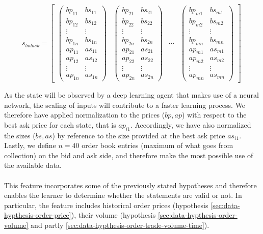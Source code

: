 \begin{equation}\label{eq:feature-bid-ask}
s_{bidask} =\begin{bmatrix}
{\displaystyle \begin{pmatrix}
bp_{11} & bs_{11}\\
bp_{12} & bs_{12}\\
\vdots  & \vdots \\
bp_{1n} & bs_{1n}\\
ap_{11} & as_{11}\\
ap_{12} & as_{12}\\
\vdots  & \vdots \\
ap_{1n} & as_{1n}
\end{pmatrix}} & \begin{pmatrix}
bp_{21} & bs_{21}\\
bp_{22} & bs_{22}\\
\vdots  & \vdots \\
bp_{2n} & bs_{2n}\\
ap_{21} & as_{21}\\
ap_{22} & as_{22}\\
\vdots  & \vdots \\
ap_{2n} & as_{2n}
\end{pmatrix} & \cdots  & \begin{pmatrix}
bp_{m1} & bs_{m1}\\
bp_{m2} & bs_{m2}\\
\vdots  & \vdots \\
bp_{mn} & bs_{mn}\\
ap_{m1} & as_{m1}\\
ap_{m2} & as_{m2}\\
\vdots  & \vdots \\
ap_{mn} & as_{mn}
\end{pmatrix}
\end{bmatrix} \ 
\end{equation}

As the state will be observed by a deep learning agent that makes use of a neural network, the scaling of inputs will contribute to a faster learning process.
We therefore have applied normalization to the prices ($bp, ap$) with respect to the best ask price for each state, that is $ap_{i1}$.
Accordingly, we have also normalized the sizes ($bs, as$) by reference to the size provided at the best ask price $as_{i1}$.
Lastly, we define $n=40$ order book entries (maximum of what goes from collection) on the bid and ask side, and therefore make the most possible use of the available data.
\\
\\
This feature incorporates some of the previously stated hypotheses and therefore enables the learner to determine whether the statements are valid or not.
In particular, the feature includes historical order prices (hypothesis \ref{sec:data-hypthesis-order-price}), their volume (hypothesis \ref{sec:data-hypthesis-order-volume} and partly \ref{sec:data-hypthesis-order-trade-volume-time}).

